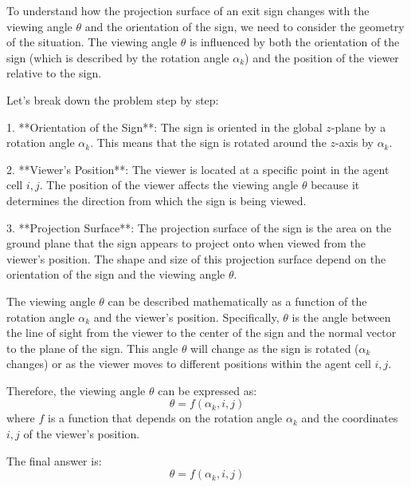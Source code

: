To understand how the projection surface of an exit sign changes with the viewing angle \(\theta\) and the orientation of the sign, we need to consider the geometry of the situation. The viewing angle \(\theta\) is influenced by both the orientation of the sign (which is described by the rotation angle \(\alpha_k\)) and the position of the viewer relative to the sign.

Let's break down the problem step by step:

1. **Orientation of the Sign**: The sign is oriented in the global \(z\)-plane by a rotation angle \(\alpha_k\). This means that the sign is rotated around the \(z\)-axis by \(\alpha_k\).

2. **Viewer's Position**: The viewer is located at a specific point in the agent cell \(i, j\). The position of the viewer affects the viewing angle \(\theta\) because it determines the direction from which the sign is being viewed.

3. **Projection Surface**: The projection surface of the sign is the area on the ground plane that the sign appears to project onto when viewed from the viewer's position. The shape and size of this projection surface depend on the orientation of the sign and the viewing angle \(\theta\).

The viewing angle \(\theta\) can be described mathematically as a function of the rotation angle \(\alpha_k\) and the viewer's position. Specifically, \(\theta\) is the angle between the line of sight from the viewer to the center of the sign and the normal vector to the plane of the sign. This angle \(\theta\) will change as the sign is rotated (\(\alpha_k\) changes) or as the viewer moves to different positions within the agent cell \(i, j\).

Therefore, the viewing angle \(\theta\) can be expressed as:
\[
\theta = f(\alpha_k, i, j)
\]
where \(f\) is a function that depends on the rotation angle \(\alpha_k\) and the coordinates \(i, j\) of the viewer's position.

The final answer is:
\[
\boxed{\theta = f(\alpha_k, i, j)}
\]
